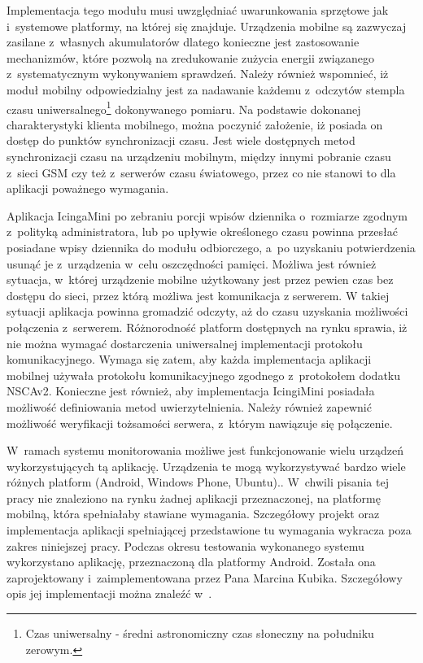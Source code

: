 Implementacja tego modułu musi uwzględniać uwarunkowania sprzętowe jak
i~systemowe platformy, na której się znajduje. Urządzenia mobilne są
zazwyczaj zasilane z~własnych akumulatorów dlatego konieczne jest
zastosowanie mechanizmów, które pozwolą na zredukowanie zużycia
energii związanego z~systematycznym wykonywaniem sprawdzeń. Należy
również wspomnieć, iż moduł mobilny odpowiedzialny jest za nadawanie
każdemu z~odczytów stempla czasu uniwersalnego\footnote{Czas
  uniwersalny - średni astronomiczny czas słoneczny na południku
  zerowym.} dokonywanego pomiaru. Na podstawie dokonanej
charakterystyki klienta mobilnego, można poczynić założenie, iż
posiada on dostęp do punktów synchronizacji czasu. Jest wiele
dostępnych metod synchronizacji czasu na urządzeniu mobilnym, między
innymi pobranie czasu z~sieci GSM czy też z~serwerów czasu światowego,
przez co nie stanowi to dla aplikacji poważnego wymagania.

Aplikacja IcingaMini po zebraniu porcji wpisów dziennika o~rozmiarze
zgodnym z~polityką administratora, lub po upływie określonego czasu
powinna przesłać posiadane wpisy dziennika do modułu odbiorczego, a~po
uzyskaniu potwierdzenia usunąć je z~urządzenia w~celu oszczędności
pamięci. Możliwa jest również sytuacja, w~której urządzenie mobilne
użytkowany jest przez pewien czas bez dostępu do sieci, przez którą
możliwa jest komunikacja z serwerem. W takiej sytuacji aplikacja
powinna gromadzić odczyty, aż do czasu uzyskania możliwości połączenia
z~serwerem. Różnorodność platform dostępnych na rynku sprawia, iż nie
można wymagać dostarczenia uniwersalnej implementacji protokołu
komunikacyjnego. Wymaga się zatem, aby każda implementacja aplikacji
mobilnej używała protokołu komunikacyjnego zgodnego z~protokołem
dodatku NSCAv2. Konieczne jest również, aby implementacja IcingiMini
posiadała możliwość definiowania metod uwierzytelnienia. Należy
również zapewnić możliwość weryfikacji tożsamości serwera, z~którym
nawiązuje się połączenie.

W~ramach systemu monitorowania możliwe jest funkcjonowanie wielu
urządzeń wykorzystujących tą aplikację. Urządzenia te mogą
wykorzystywać bardzo wiele różnych platform (Android, Windows Phone,
Ubuntu).. W~chwili pisania tej pracy nie znaleziono na rynku żadnej
aplikacji przeznaczonej, na platformę mobilną, która spełniałaby
stawiane wymagania. Szczegółowy projekt oraz implementacja aplikacji
spełniającej przedstawione tu wymagania wykracza poza zakres
niniejszej pracy. Podczas okresu testowania wykonanego systemu
wykorzystano aplikację, przeznaczoną dla platformy Android. Została
ona zaprojektowany i~zaimplementowana przez Pana Marcina
Kubika. Szczegółowy opis jej implementacji można znaleźć
w~\cite{book:pracaKubika}.

